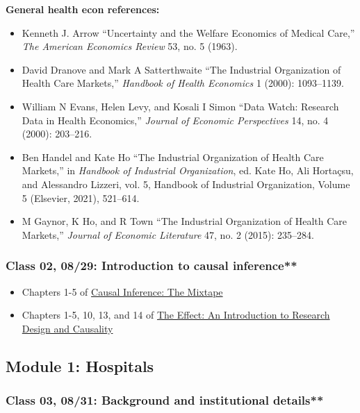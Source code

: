 \documentclass[11pt,]{article}
\providecommand{\tightlist}{%
  \setlength{\itemsep}{0pt}\setlength{\parskip}{0pt}}
\begin{document}
\textbf{General health econ references:}

\begin{itemize}
\tightlist
\item
  Kenneth J. Arrow {``Uncertainty and the {Welfare} {Economics} of
  {Medical} {Care},''} \emph{The American Economics Review} 53, no. 5
  (1963).
\item
  David Dranove and Mark A Satterthwaite {``The Industrial Organization
  of Health Care Markets,''} \emph{Handbook of Health Economics} 1
  (2000): 1093--1139.
\item
  William N Evans, Helen Levy, and Kosali I Simon {``Data Watch:
  {Research} Data in Health Economics,''} \emph{Journal of Economic
  Perspectives} 14, no. 4 (2000): 203--216.
\item
  Ben Handel and Kate Ho {``The Industrial Organization of Health Care
  Markets,''} in \emph{Handbook of {Industrial} {Organization}}, ed.
  Kate Ho, Ali Hortaçsu, and Alessandro Lizzeri, vol. 5, Handbook of
  {Industrial} {Organization}, {Volume} 5 (Elsevier, 2021), 521--614.
\item
  M Gaynor, K Ho, and R Town {``The {Industrial} {Organization} of
  {Health} {Care} {Markets},''} \emph{Journal of Economic Literature}
  47, no. 2 (2015): 235--284.
\end{itemize}

\hypertarget{class-02-0829-introduction-to-causal-inference}{%
\subsubsection{Class 02, 08/29: Introduction to causal
inference**}\label{class-02-0829-introduction-to-causal-inference}}

\begin{itemize}
\tightlist
\item
  Chapters 1-5 of \href{https://mixtape.scunning.com/}{Causal Inference:
  The Mixtape}
\item
  Chapters 1-5, 10, 13, and 14 of \href{https://theeffectbook.net/}{The
  Effect: An Introduction to Research Design and Causality}
\end{itemize}

\hypertarget{module-1-hospitals}{%
\subsection{Module 1: Hospitals}\label{module-1-hospitals}}

\hypertarget{class-03-0831-background-and-institutional-details}{%
\subsubsection{Class 03, 08/31: Background and institutional
details**}\label{class-03-0831-background-and-institutional-details}}
\end{document}
